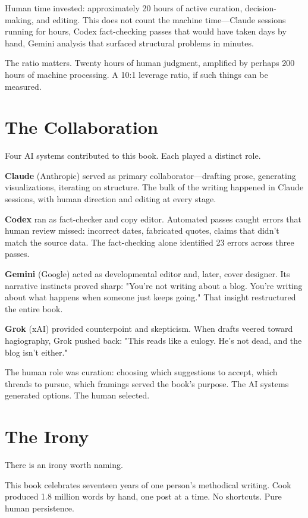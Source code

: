 Human time invested: approximately 20 hours of active curation, decision-making, and editing. This does not count the machine time—Claude sessions running for hours, Codex fact-checking passes that would have taken days by hand, Gemini analysis that surfaced structural problems in minutes.

The ratio matters. Twenty hours of human judgment, amplified by perhaps 200 hours of machine processing. A 10:1 leverage ratio, if such things can be measured.

\bigskip

\section*{The Collaboration}

Four AI systems contributed to this book. Each played a distinct role.

\textbf{Claude} (Anthropic) served as primary collaborator—drafting prose, generating visualizations, iterating on structure. The bulk of the writing happened in Claude sessions, with human direction and editing at every stage.

\textbf{Codex} ran as fact-checker and copy editor. Automated passes caught errors that human review missed: incorrect dates, fabricated quotes, claims that didn't match the source data. The fact-checking alone identified 23 errors across three passes.

\textbf{Gemini} (Google) acted as developmental editor and, later, cover designer. Its narrative instincts proved sharp: "You're not writing about a blog. You're writing about what happens when someone just keeps going." That insight restructured the entire book.

\textbf{Grok} (xAI) provided counterpoint and skepticism. When drafts veered toward hagiography, Grok pushed back: "This reads like a eulogy. He's not dead, and the blog isn't either."

The human role was curation: choosing which suggestions to accept, which threads to pursue, which framings served the book's purpose. The AI systems generated options. The human selected.

\bigskip

\section*{The Irony}

There is an irony worth naming.

This book celebrates seventeen years of one person's methodical writing. Cook produced 1.8 million words by hand, one post at a time. No shortcuts. Pure human persistence.

